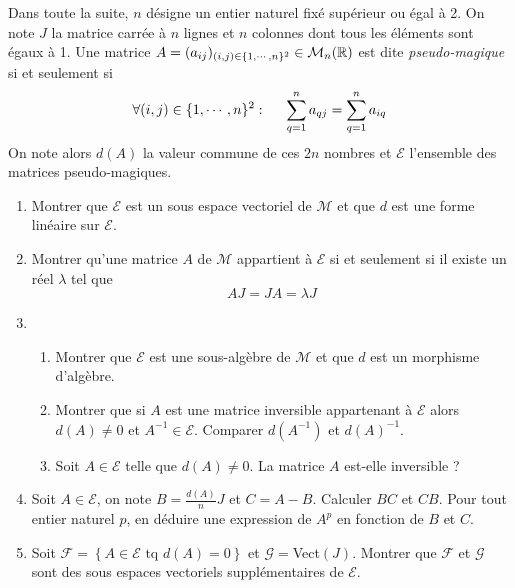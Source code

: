 Dans toute la suite, $n$ d\'{e}signe un entier naturel fix\'{e} sup\'{e}rieur ou \'{e}gal \`{a} 2.\newline
On note $J$ la matrice carrée à $n$ lignes et $n$ colonnes dont tous les \'{e}l\'{e}ments sont \'{e}gaux \`{a} 1.\newline
Une matrice $A= (a_{ij})_{(i,j)\in \{1,\cdots,n\}^2}\in \mathcal M_n(\mathbb{R})$ est dite \emph{pseudo-magique} si et seulement si 
\begin{displaymath}
\forall (i,j)\in \{1,\cdots,n\}^2:\hspace{0.5cm}
\sum_{q=1}^{n}a_{qj} = \sum_{q=1}^{n}a_{iq}
\end{displaymath}
On note alors $d(A)$ la valeur commune de ces $2n$ nombres et $\mathcal{E}$ l'ensemble des matrices pseudo-magiques.
\begin{enumerate}
\item  Montrer que $\mathcal{E}$ est un sous espace vectoriel de $\mathcal{M}$ et que $d$ est une forme lin\'{e}aire sur $\mathcal{E}$.

\item  Montrer qu'une matrice $A$ de $\mathcal{M}$ appartient \`{a} $\mathcal{E}$ si et seulement si il existe un r\'{e}el $\lambda $ tel que 
\[
AJ=JA=\lambda J
\]

\item 
\begin{enumerate}
\item  Montrer que $\mathcal{E}$ est une sous-alg\`{e}bre de $\mathcal{M}$ et que $d$ est un morphisme d'algèbre.

\item  Montrer que si $A$ est une matrice inversible appartenant \`{a} $\mathcal{E}$ alors $d(A)\neq 0$ et $A^{-1}\in \mathcal{E}$. Comparer $d(A^{-1})$ et $d(A)^{-1}$.
\item Soit $A\in \mathcal E$ telle que $d(A)\neq0$. La matrice $A$ est-elle inversible ?
\end{enumerate}

\item  Soit $A\in \mathcal{E}$, on note $B=\frac{d(A)}{n}J$ et $C=A-B$. Calculer $BC$ et $CB$. Pour tout entier naturel $p$, en déduire une expression de $A^{p}$ en fonction de $B$ et $C$.

\item  Soit $\mathcal{F=}\left\{ A\in \mathcal{E}\text{ tq }d(A)=0\right\}$ et $\mathcal{G=}$Vect$(J)$. Montrer que $\mathcal{F}$ et $\mathcal{G}$ sont des sous espaces vectoriels suppl\'{e}mentaires de $\mathcal{E}$.


\end{enumerate}
